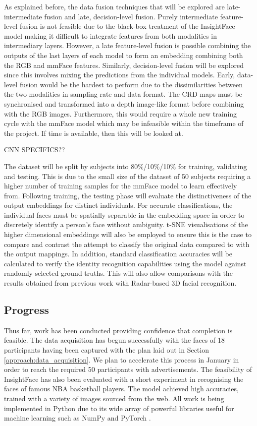 \documentclass{interim}
\begin{document}
As explained before, the data fusion techniques that will be explored are late-intermediate fusion and late, decision-level fusion. Purely intermediate feature-level fusion is not feasible due to the black-box treatment of the InsightFace model making it difficult to integrate features from both modalities in intermediary layers. However, a late feature-level fusion is possible combining the outputs of the last layers of each model to form an embedding combining both the RGB and mmFace features. Similarly, decision-level fusion will be explored since this involves mixing the predictions from the individual models. Early, data-level fusion would be the hardest to perform due to the dissimilarities between the two modalities in sampling rate and data format. The CRD maps must be synchronised and transformed into a depth image-like format before combining with the RGB images. Furthermore, this would require a whole new training cycle with the mmFace model which may be infeasible within the timeframe of the project. If time is available, then this will be looked at.

CNN SPECIFICS??

The dataset will be split by subjects into 80\%/10\%/10\% for training, validating and testing. This is due to the small size of the dataset of 50 subjects requiring a higher number of training samples for the mmFace model to learn effectively from. Following training, the testing phase will evaluate the distinctiveness of the output embeddings for distinct individuals. For accurate classifications, the individual faces must be spatially separable in the embedding space in order to discretely identify a person's face without ambiguity. t-SNE visualisations \cite{van2008visualizing} of the higher dimensional embeddings will also be employed to ensure this is the case to compare and contrast the attempt to classify the original data compared to with the output mappings. In addition, standard classification accuracies will be calculated to verify the identity recognition capabilities using the model against randomly selected ground truths. This will also allow comparisons with the results obtained from previous work with Radar-based 3D facial recognition.


\subsection{Progress}
\label{approach:progress}
Thus far, work has been conducted providing confidence that completion is feasible. The data acquisition has begun successfully with the faces of 18 participants having been captured with the plan laid out in Section \ref{approach:data_acquisition}. We plan to accelerate this process in January in order to reach the required 50 participants with advertisements. The feasibility of InsightFace has also been evaluated with a short experiment in recognising the faces of famous NBA basketball players. The model achieved high accuracies, trained with a variety of images sourced from the web. All work is being implemented in Python due to its wide array of powerful libraries useful for machine learning such as NumPy \cite{harris2020array} and PyTorch \cite{paszke2019pytorch}.
\end{document}
